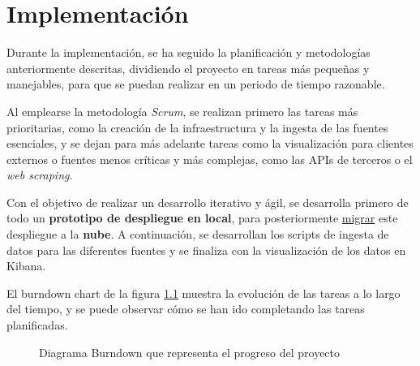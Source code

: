 \chapter{Implementación}
Durante la implementación, se ha seguido la planificación y metodologías
anteriormente descritas, dividiendo el proyecto en tareas más pequeñas y
manejables, para que se puedan realizar en un periodo de tiempo razonable.

Al emplearse la metodología \textit{Scrum}, se realizan primero las tareas más
prioritarias, como la creación de la infraestructura y la ingesta de las fuentes
esenciales, y se dejan para más adelante tareas como la visualización para
clientes externos o fuentes menos críticas y más complejas, como las APIs de
terceros o el \textit{web scraping}.

Con el objetivo de realizar un desarrollo iterativo y ágil, se desarrolla
primero de todo un \textbf{prototipo de despliegue en local}, para
posteriormente \underline{migrar} este despliegue a la \textbf{nube}.
A continuación, se desarrollan los scripts de ingesta de datos para las
diferentes fuentes y se finaliza con la visualización de los datos en Kibana.

El burndown chart de la figura \ref{fig:burndown} muestra la evolución de las
tareas a lo largo del tiempo, y se puede observar cómo se han ido completando
las tareas planificadas.

\begin{figure}[htbp]
	\centering
	\caption{Diagrama Burndown que representa el progreso del proyecto}
	\label{fig:burndown}
\end{figure}

